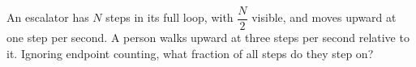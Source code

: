 An escalator has $N$ steps in its full loop, with $\dfrac{N}{2}$ visible, and moves upward at one step per second. A person walks upward at three steps per second relative to it. Ignoring endpoint counting, what fraction of all steps do they step on?
